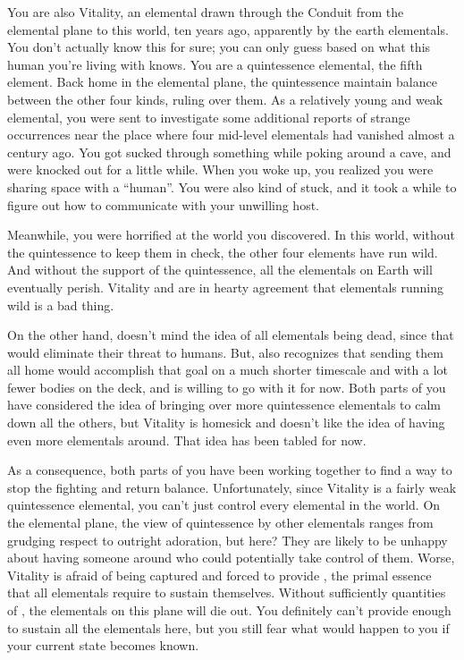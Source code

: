 \documentclass[char]{elementals}
\begin{document}
You are also Vitality, an elemental drawn through the Conduit from the elemental plane to this world, ten years ago, apparently by the earth elementals.  You don't actually know this for sure; you can only guess based on what this human you're living with knows.  You are a quintessence elemental, the fifth element.  Back home in the elemental plane, the quintessence maintain balance between the other four kinds, ruling over them.  As a relatively young and weak elemental, you were sent to investigate some additional reports of strange occurrences near the place where four mid-level elementals had vanished almost a century ago.  You got sucked through something while poking around a cave, and were knocked out for a little while.  When you woke up, you realized you were sharing space with a ``human''.  You were also kind of stuck, and it took a while to figure out how to communicate with your unwilling host.

Meanwhile, you were horrified at the world you discovered.  In this world, without the quintessence to keep them in check, the other four elements have run wild.  And without the support of the quintessence, all the elementals on Earth will eventually perish.  Vitality and \cAvatar{} are in hearty agreement that elementals running wild is a bad thing.

On the other hand, \cAvatar{} doesn't mind the idea of all elementals being dead, since that would eliminate their threat to humans.  But, \cAvatar{} also recognizes that sending them all home would accomplish that goal on a much shorter timescale and with a lot fewer bodies on the deck, and is willing to go with it for now.  Both parts of you have considered the idea of bringing over more quintessence elementals to calm down all the others, but Vitality is homesick and \cAvatar{} doesn't like the idea of having even more elementals around.  That idea has been tabled for now.

As a consequence, both parts of you have been working together to find a way to stop the fighting and return balance.  Unfortunately, since Vitality is a fairly weak quintessence elemental, you can't just control every elemental in the world.  On the elemental plane, the view of quintessence by other elementals ranges from grudging respect to outright adoration, but here?  They are likely to be unhappy about having someone around who could potentially take control of them.  Worse, Vitality is afraid of being captured and forced to provide \iWhiteQ{}, the primal essence that all elementals require to sustain themselves. Without sufficiently quantities of \iWhiteQ{\MYname{}}, the elementals on this plane will die out. You definitely can't provide enough to sustain all the elementals here, but you still fear what would happen to you if your current state becomes known.
\end{document}
